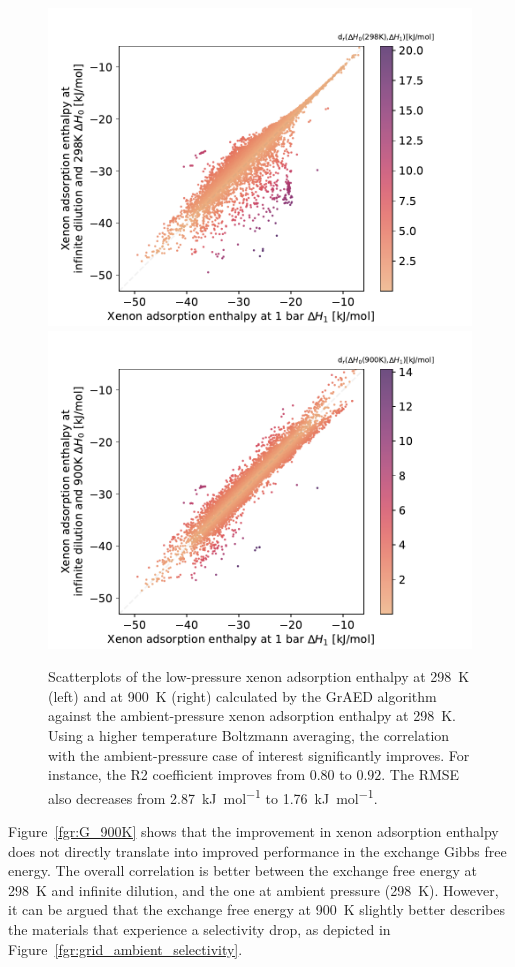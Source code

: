 \documentclass[main]{subfiles}
\begin{document}
\begin{figure}[ht]
\centering
  \includegraphics[width=0.45\linewidth]{figures/4-ml/SI_figure/Scatterplot_H1_H0.pdf}
  \hfill
  \includegraphics[width=0.45\linewidth]{figures/4-ml/SI_figure/Scatterplot_H1_H900K.pdf}
  \caption{Scatterplots of the low-pressure xenon adsorption enthalpy at \SI{298}{\kelvin} (left) and at \SI{900}{\kelvin} (right) calculated by the GrAED algorithm against the ambient-pressure xenon adsorption enthalpy at \SI{298}{\kelvin}. Using a higher temperature Boltzmann averaging, the correlation with the ambient-pressure case of interest significantly improves. For instance, the R2 coefficient improves from $0.80$ to $0.92$. The RMSE also decreases from \SI{2.87}{\kilo\joule\per\mole} to \SI{1.76}{\kilo\joule\per\mole}. }\label{fgr:H_900K}
\end{figure}

Figure~\ref{fgr:G_900K} shows that the improvement in xenon adsorption enthalpy does not directly translate into improved performance in the exchange Gibbs free energy. The overall correlation is better between the exchange free energy at \SI{298}{\kelvin} and infinite dilution, and the one at ambient pressure (\SI{298}{\kelvin}). However, it can be argued that the exchange free energy at \SI{900}{\kelvin} slightly better describes the materials that experience a selectivity drop, as depicted in Figure~\ref{fgr:grid_ambient_selectivity}. 
\end{document}

